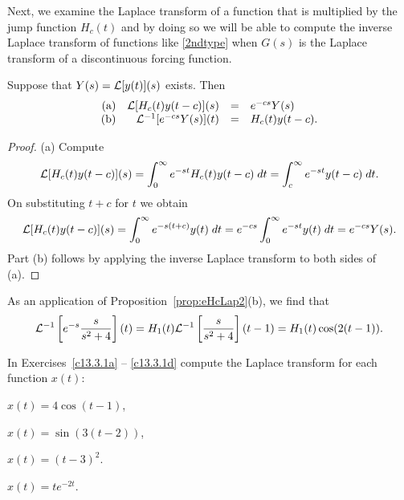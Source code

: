 \documentclass{ximera}
\begin{document}
Next, we examine the Laplace transform of a function that is multiplied 
by the jump function $H_c(t)$ and by doing so we will be able to compute the
inverse Laplace transform of functions like \eqref{2ndtype} when $G(s)$ is the 
Laplace transform of a discontinuous forcing function.

\begin{proposition}  \label{prop:eHcLap2}
Suppose that $Y(s)={\cal L}[y(t)](s)$ exists.  Then
\[
\begin{array}{rrcl}
\mbox{(a)} & {\cal L}[H_c(t)y(t-c)](s) & = & e^{-cs} Y(s) \\
\mbox{(b)} & {\cal L}^{-1}[e^{-cs}Y(s)](t) & = & H_c(t)y(t-c).
\end{array}
\]
\end{proposition}

\begin{proof} (a)  Compute
\[
{\cal L}[H_c(t)y(t-c)](s) = \int_0^{\infty} e^{-st}H_c(t) y(t-c)\; dt
= \int_c^{\infty} e^{-st}y(t-c)\; dt.
\]
On substituting $t+c$ for $t$ we obtain
\[
{\cal L}[H_c(t)y(t-c)](s)=\int_0^{\infty} e^{-s(t+c)}y(t)\; dt
=e^{-cs} \int_0^{\infty} e^{-st}y(t)\; dt
=e^{-cs} Y(s).
\]
Part (b) follows by applying the inverse Laplace transform to both sides 
of (a).  \end{proof}

As an application of Proposition~\ref{prop:eHcLap2}(b), we find that
\[
{\cal L}^{-1}\left[ e^{-s}\frac{s}{s^2+4}\right](t)=
H_1(t){\cal L}^{-1}\left[ \frac{s}{s^2+4}\right](t-1)=
H_1(t)\cos(2(t-1)).
\]

\EXER

\TEXER

\noindent In Exercises~\ref{c13.3.1a} -- \ref{c13.3.1d} compute the Laplace 
transform for each function $x(t)$:
\begin{exercise} \label{c13.3.1a}
$x(t) = 4\cos(t-1)$,
\end{exercise}
\begin{exercise} \label{c13.3.1b}
$x(t) = \sin(3(t-2))$,
\end{exercise}
\begin{exercise} \label{c13.3.1c}
$x(t) = (t-3)^2$.
\end{exercise}
\begin{exercise} \label{c13.3.1d}
$x(t) = te^{-2t}$.
\end{exercise}
\end{document}
